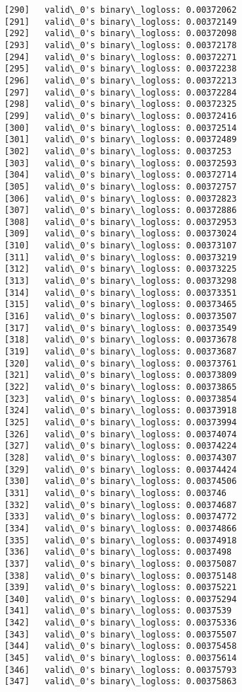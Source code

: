 \documentclass[11pt]{article}
\begin{document}
\begin{Verbatim}[commandchars=\\\{\}]
[290]	valid\_0's binary\_logloss: 0.00372062
[291]	valid\_0's binary\_logloss: 0.00372149
[292]	valid\_0's binary\_logloss: 0.00372098
[293]	valid\_0's binary\_logloss: 0.00372178
[294]	valid\_0's binary\_logloss: 0.00372271
[295]	valid\_0's binary\_logloss: 0.00372238
[296]	valid\_0's binary\_logloss: 0.00372213
[297]	valid\_0's binary\_logloss: 0.00372284
[298]	valid\_0's binary\_logloss: 0.00372325
[299]	valid\_0's binary\_logloss: 0.00372416
[300]	valid\_0's binary\_logloss: 0.00372514
[301]	valid\_0's binary\_logloss: 0.00372489
[302]	valid\_0's binary\_logloss: 0.0037253
[303]	valid\_0's binary\_logloss: 0.00372593
[304]	valid\_0's binary\_logloss: 0.00372714
[305]	valid\_0's binary\_logloss: 0.00372757
[306]	valid\_0's binary\_logloss: 0.00372823
[307]	valid\_0's binary\_logloss: 0.00372886
[308]	valid\_0's binary\_logloss: 0.00372953
[309]	valid\_0's binary\_logloss: 0.00373024
[310]	valid\_0's binary\_logloss: 0.00373107
[311]	valid\_0's binary\_logloss: 0.00373219
[312]	valid\_0's binary\_logloss: 0.00373225
[313]	valid\_0's binary\_logloss: 0.00373298
[314]	valid\_0's binary\_logloss: 0.00373351
[315]	valid\_0's binary\_logloss: 0.00373465
[316]	valid\_0's binary\_logloss: 0.00373507
[317]	valid\_0's binary\_logloss: 0.00373549
[318]	valid\_0's binary\_logloss: 0.00373678
[319]	valid\_0's binary\_logloss: 0.00373687
[320]	valid\_0's binary\_logloss: 0.00373761
[321]	valid\_0's binary\_logloss: 0.00373809
[322]	valid\_0's binary\_logloss: 0.00373865
[323]	valid\_0's binary\_logloss: 0.00373854
[324]	valid\_0's binary\_logloss: 0.00373918
[325]	valid\_0's binary\_logloss: 0.00373994
[326]	valid\_0's binary\_logloss: 0.00374074
[327]	valid\_0's binary\_logloss: 0.00374224
[328]	valid\_0's binary\_logloss: 0.00374307
[329]	valid\_0's binary\_logloss: 0.00374424
[330]	valid\_0's binary\_logloss: 0.00374506
[331]	valid\_0's binary\_logloss: 0.003746
[332]	valid\_0's binary\_logloss: 0.00374687
[333]	valid\_0's binary\_logloss: 0.00374772
[334]	valid\_0's binary\_logloss: 0.00374866
[335]	valid\_0's binary\_logloss: 0.00374918
[336]	valid\_0's binary\_logloss: 0.0037498
[337]	valid\_0's binary\_logloss: 0.00375087
[338]	valid\_0's binary\_logloss: 0.00375148
[339]	valid\_0's binary\_logloss: 0.00375221
[340]	valid\_0's binary\_logloss: 0.00375294
[341]	valid\_0's binary\_logloss: 0.0037539
[342]	valid\_0's binary\_logloss: 0.00375336
[343]	valid\_0's binary\_logloss: 0.00375507
[344]	valid\_0's binary\_logloss: 0.00375458
[345]	valid\_0's binary\_logloss: 0.00375614
[346]	valid\_0's binary\_logloss: 0.00375793
[347]	valid\_0's binary\_logloss: 0.00375863

\end{Verbatim}
\end{document}
